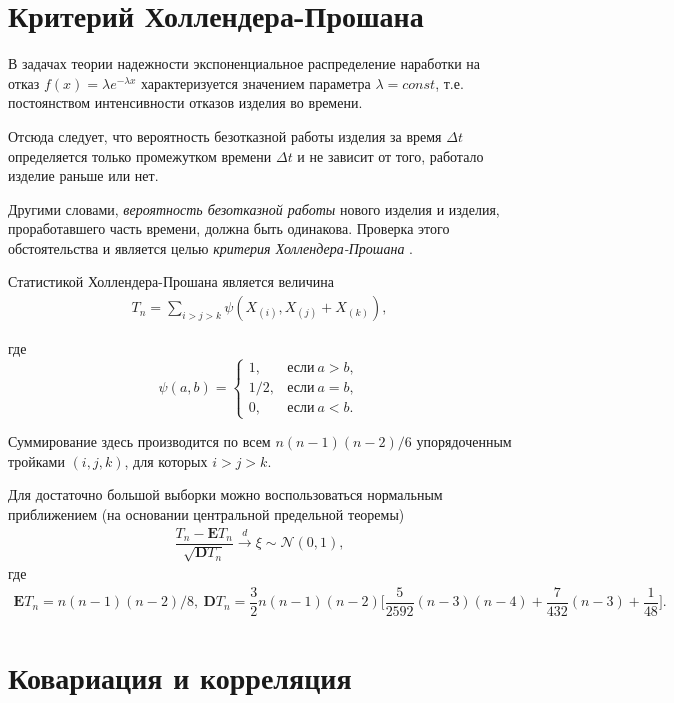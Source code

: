 \documentclass[%
	11pt,
	a4paper,
	utf8,
		]{article}
\begin{document}
\section{Критерий Холлендера-Прошана}

В задачах теории надежности экспоненциальное распределение наработки на отказ $ f(x) = \lambda e^{-\lambda x} $ характеризуется значением параметра $ \lambda = const $, т.е. постоянством интенсивности отказов изделия во времени.

Отсюда следует, что вероятность безотказной работы изделия за время $ \Delta t $ определяется только промежутком времени $ \Delta t $ и не зависит от того, работало изделие раньше или нет.

Другими словами, \emph{вероятность безотказной работы} нового изделия и изделия, проработавшего часть времени, должна быть одинакова. Проверка этого обстоятельства и является целью \emph{критерия Холлендера-Прошана} \cite[295]{kobzar:2012}.

Статистикой Холлендера-Прошана является величина \cite[182]{lagutin:2009}
\begin{align*}
	T_n = \sum_{i > j > k} \psi (X_{(i)}, X_{(j)} + X_{(k)}),
\end{align*}

где
$$
  \psi(a, b) = 
    \begin{cases}
    	1, &\text{если}\ a > b,\\
    	1/2, &\text{если}\ a = b,\\
    	0, &\text{если}\ a < b.
    \end{cases}
$$

Суммирование здесь производится по всем $ n(n-1)(n-2)/6 $ упорядоченным тройками $ (i, j, k) $, для которых $ i > j > k $.

Для достаточно большой выборки можно воспользоваться нормальным приближением (на основании центральной предельной теоремы)
\begin{align*}
	\dfrac{ T_n - \mathbf{E}T_n }{ \sqrt{\mathbf{D}T_n} } \xrightarrow{d} \xi \sim \mathcal{N}(0, 1),
\end{align*}
где
\begin{align*}
	\mathbf{E} T_n = n(n-1)(n-2)/8, \ 
	\mathbf{D} T_n = \dfrac{3}{2}n(n-1)(n-2)\Bigg[ \dfrac{5}{2592}(n - 3)(n - 4) + \dfrac{7}{432}(n - 3) + \dfrac{1}{48} \Bigg].
\end{align*}

\section{Ковариация и корреляция}
\end{document}
